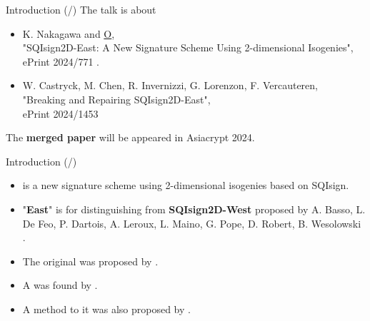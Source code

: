 \newcommand*{\introTotal}{\total{intro}}
\begin{frame}{Introduction (/\introTotal{})}
    The talk is about 

    \begin{itemize}
        \setlength{\itemsep}{10pt}
        \item K. Nakagawa and \underline{O},\\
            "SQIsign2D-East: A New Signature Scheme Using 2-dimensional Isogenies",\\
            ePrint 2024/771
            \cite{no2024sqisign2d}.

        \item W. Castryck, M. Chen, R. Invernizzi, G. Lorenzon, F. Vercauteren,\\
                "Breaking and Repairing SQIsign2D-East",\\
                ePrint 2024/1453
                \cite{CCILV2024sqisign2d_attack}
    \end{itemize}

    \vspace{10pt}
    The \textbf{merged paper} will be appeared in Asiacrypt 2024.
\end{frame}

\begin{frame}{Introduction (/\introTotal{})}
    \begin{itemize}
        \setlength{\itemsep}{10pt}
        \item {} is a new signature scheme using 2-dimensional isogenies based on SQIsign.
        \item "\textbf{East}" is for distinguishing from
                \textbf{SQIsign2D-West} proposed by
                A. Basso, L. De Feo, P. Dartois, A. Leroux, L. Maino,
                G.  Pope, D. Robert, B. Wesolowski
                \cite{BDDLMPRW2024sqisign2d}.
        \item The original  was proposed by \cite{no2024sqisign2d}.
        \item A  was found by \cite{CCILV2024sqisign2d_attack}.
        \item A method to  it was also proposed by \cite{CCILV2024sqisign2d_attack}.
    \end{itemize}
\end{frame}

